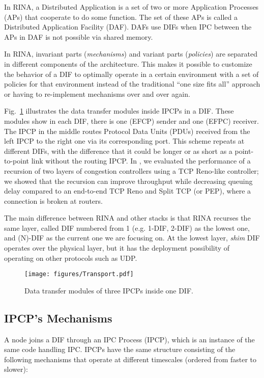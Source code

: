 \documentclass{ieeeaccess}
\begin{document}
In RINA, a Distributed Application is a set of two or more Application Processes (APs) that cooperate to do some function. The set of these APs is called a Distributed Application Facility (DAF). DAFs use DIFs when IPC between the APs in DAF is not possible via shared memory. 

In RINA, invariant parts (\textit{mechanisms}) and variant parts (\textit{policies}) are separated in different components of the architecture. This makes it possible to customize the behavior of a DIF to optimally operate in a certain environment with a set of policies for that environment instead of the traditional ``one size fits all'' approach or having to re-implement mechanisms over and over again.

Fig.~\ref{fig:rina-trans} illustrates the data transfer modules inside IPCPs in a DIF. These modules show in each DIF, there is one (EFCP) sender and one (EFPC) receiver. The IPCP in the middle routes Protocol Data Units (PDUs) received from the left IPCP to the right one via its corresponding port. This scheme repeats at different DIFs, with the difference that it could be longer or as short as a point-to-point link without the routing IPCP. In \cite{peymanICC16}, we evaluated the performance of a recursion of two layers of congestion controllers using a TCP Reno-like controller; we showed that the recursion can improve throughput while decreasing queuing delay compared to an end-to-end TCP Reno and Split TCP (or PEP), where a connection is broken at routers.

The main difference between RINA and other stacks is that RINA recurses the same layer, called DIF numbered from 1 (e.g. 1-DIF, 2-DIF) as the lowest one, and (N)-DIF as the current one we are focusing on. At the lowest layer, \textit{shim} DIF operates over the physical layer, but it has the deployment possibility of operating on other protocols such as UDP.

\begin{figure}[!t]
	\centering
	\texttt{[image: figures/Transport.pdf]}
	\caption{Data transfer modules of three IPCPs inside one DIF.}
	\label{fig:rina-trans}
\end{figure}




\subsection{IPCP's Mechanisms}

A node joins a DIF through an IPC Process (IPCP), which is an instance of the same code handling IPC. IPCPs have the same structure consisting of the following mechanisms that operate at different timescales (ordered from faster to slower):
\end{document}
